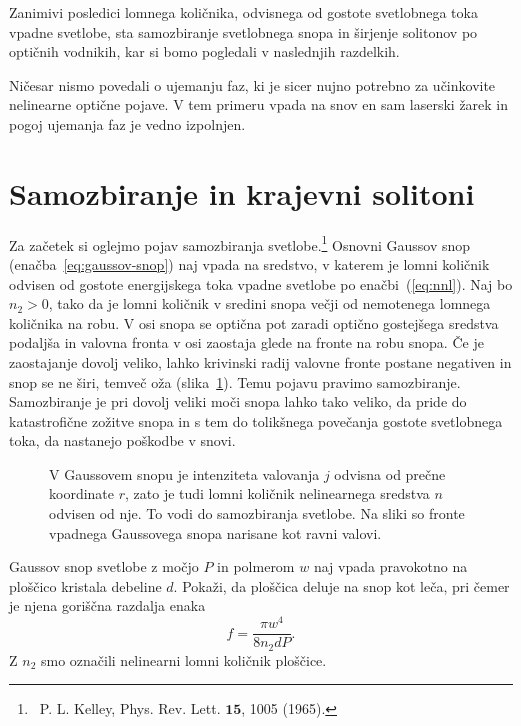 Zanimivi posledici lomnega količnika, odvisnega od gostote svetlobnega toka vpadne svetlobe, 
sta samozbiranje svetlobnega snopa in širjenje solitonov po optičnih vodnikih, 
kar si bomo pogledali v naslednjih razdelkih.

\begin{remark}
Ničesar nismo povedali o ujemanju faz, ki je sicer nujno potrebno za učinkovite nelinearne 
optične pojave. V tem primeru vpada na snov en sam laserski žarek in pogoj ujemanja faz
je vedno izpolnjen. 
\end{remark}

\section{Samozbiranje in krajevni solitoni}
Za začetek si oglejmo pojav samozbiranja svetlobe.\footnote{~P. L. Kelley, Phys. Rev. Lett. $\mathbf{15}$,
1005 (1965).}
Osnovni Gaussov snop 
(enačba~\ref{eq:gaussov-snop}) naj vpada na sredstvo, v katerem je lomni 
količnik odvisen od gostote energijskega toka vpadne svetlobe po enačbi~(\ref{eq:nnl}).
Naj bo $n_{2}>0$, tako da je lomni količnik v sredini snopa večji 
od nemotenega lomnega količnika na robu. V osi snopa se optična pot 
zaradi optično gostejšega sredstva podaljša in valovna fronta 
v osi zaostaja glede na fronte na robu snopa. Če je zaostajanje dovolj veliko,
lahko krivinski radij valovne fronte postane negativen in snop se
ne širi, temveč oža (slika~\ref{fig:sf1}). Temu pojavu pravimo 
samozbiranje. Samozbiranje je pri dovolj
veliki moči snopa lahko tako veliko, da pride do katastrofične zožitve snopa
in s tem do tolikšnega povečanja gostote svetlobnega toka, da nastanejo
poškodbe v snovi.
\begin{figure}[ht]
\centering
\def\svgwidth{95truemm} 

\caption{V Gaussovem snopu je intenziteta valovanja $j$ odvisna od prečne koordinate $r$, 
zato je tudi lomni količnik nelinearnega sredstva  $n$ odvisen od nje. To vodi do 
 samozbiranja svetlobe. Na sliki so fronte vpadnega Gaussovega snopa narisane kot ravni valovi.}
\label{fig:sf1}
\end{figure}
\begin{definition}
Gaussov snop svetlobe z močjo $P$ in polmerom $w$ naj vpada pravokotno na ploščico
kristala debeline $d$. Pokaži, da ploščica deluje na snop kot leča, pri čemer je njena
goriščna razdalja enaka  
\begin{equation}
f = \frac{\pi w^4}{8 n_2 d P}.
\end{equation}
Z $n_2$ smo označili nelinearni lomni količnik ploščice.
\end{definition}

